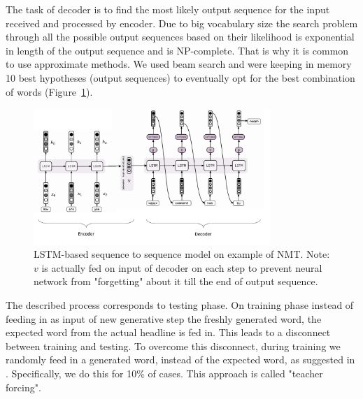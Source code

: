 The task of decoder is to find the most likely output sequence for the input received and processed by encoder. Due to big vocabulary size the search problem through all the possible output sequences based on their likelihood is exponential in length of the output sequence and is NP-complete. That is why it is common to use approximate methods. We used beam search and were keeping in memory 10 best hypotheses (output sequences) to eventually opt for the best combination of words (Figure~\ref{fig:encoder-decoder-lstm}). 

\begin{figure}[h]
\centering
	\includegraphics[width=0.8\textwidth]{img/seq2seq-detailed.png}
	\caption{\label{fig:encoder-decoder-lstm}LSTM-based sequence to sequence model on example of NMT. Note: $v$ is actually fed on input of decoder on each step to prevent neural network from "forgetting" about it till the end of output sequence. }
\end{figure}



The described process corresponds to testing phase. On training phase instead of feeding in as input of new generative step the freshly generated word, the expected word from the actual headline is fed in. This leads to a disconnect between training and testing. To overcome this disconnect, during training we randomly feed in a generated word, instead of the expected word, as suggested in \cite{scheduled_sampling}. Specifically, we do this for 10\% of cases. This approach is called "teacher forcing".

